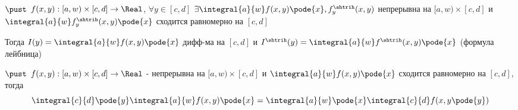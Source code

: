 \begin{proofs}
	$\pust$ $f(x,y): [a,w) \times [c,d] \to \Real$, $\forall y \in [c,d]$ $\exists
	\integral{a}{w}f(x,y)\pode{x}, f^{\shtrih}_{y}(x,y)$ непрерывна на $[a,w) \times [c,d]$ и
	$\integral{a}{w}f^{\shtrih}_{y}(x,y)\pode{x}$ сходится равномерно на $[c,d]$

	Тогда $I(y) = \integral{a}{w}f(x,y)\pode{x}$ дифф-ма на $[c,d]$ и $I^{\shtrih}(y)= \integral{a}{w}f^{\shtrih}(x,y)\pode{x}$ (формула лейбница)
\end{proofs}

\begin{proofs}
		$\pust$ $f(x,y): [a,w) \times [c,d] \to \Real$ - непрерывна на $[a,w) \times [c,d]$ и $\integral{a}{w}f(x,y)\pode{x}$ сходится равномерно на $[c,d]$, тогда
		$$\integral{c}{d}\pode{y}\integral{a}{w}f(x,y)\pode{x} = \integral{a}{w}\pode{x}\integral{c}{d}f(x,y\pode{y})$$
\end{proofs}
